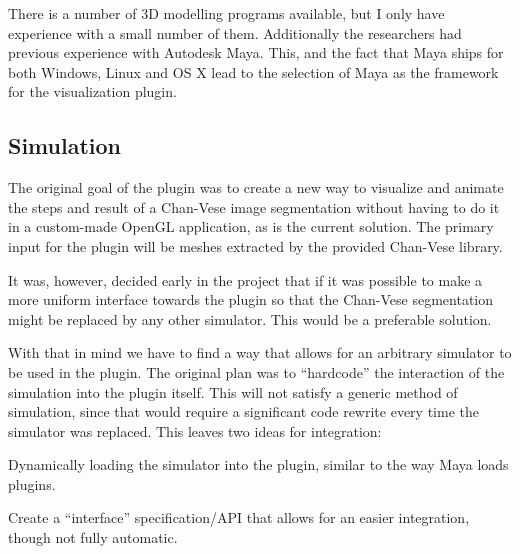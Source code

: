There is a number of 3D modelling programs available, but I only have experience
with a small number of them. Additionally the researchers had previous
experience with Autodesk Maya. This, and the fact that Maya ships for both
Windows, Linux and OS X lead to the selection of Maya as the framework for the
visualization plugin.



\subsection{Simulation}
\label{sec:sim}
The original goal of the plugin was to create a new way to visualize and animate
the steps and result of a Chan-Vese image segmentation without having to do it
in a custom-made OpenGL application, as is the current solution. The primary
input for the plugin will be meshes extracted by the provided Chan-Vese library.

It was, however, decided early in the project that if it was possible to make a
more uniform interface towards the plugin so that the Chan-Vese segmentation
might be replaced by any other simulator. This would be a preferable solution.

With that in mind we have to find a way that allows for an arbitrary simulator
to be used in the plugin. The original plan was to ``hardcode''
the interaction of the simulation into the plugin itself. This will not satisfy
a generic method of simulation, since that would require a significant code rewrite
every time the simulator was replaced. This leaves two ideas for integration:
\begin{enumerate*}
  \item Dynamically loading the simulator into the plugin, similar to the way Maya
    loads plugins.
  \item Create a ``interface'' specification/API that allows for an easier
    integration, though not fully automatic.
\end{enumerate*}

